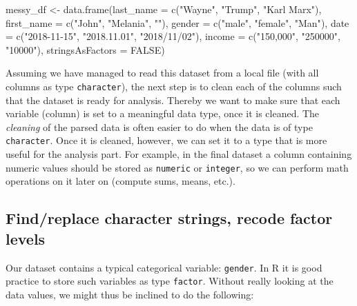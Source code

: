 \documentclass[
  12pt,
]{style/krantz}
\newenvironment{Shaded}{\begin{snugshade}}{\end{snugshade}}
\newcommand{\AttributeTok}[1]{\textcolor[rgb]{0.77,0.63,0.00}{#1}}
\newcommand{\ConstantTok}[1]{\textcolor[rgb]{0.00,0.00,0.00}{#1}}
\newcommand{\FunctionTok}[1]{\textcolor[rgb]{0.00,0.00,0.00}{#1}}
\newcommand{\NormalTok}[1]{#1}
\newcommand{\OtherTok}[1]{\textcolor[rgb]{0.56,0.35,0.01}{#1}}
\newcommand{\StringTok}[1]{\textcolor[rgb]{0.31,0.60,0.02}{#1}}
\begin{document}
\begin{Shaded}
\begin{Highlighting}[]
\NormalTok{messy\_df }\OtherTok{\textless{}{-}} \FunctionTok{data.frame}\NormalTok{(}\AttributeTok{last\_name =} \FunctionTok{c}\NormalTok{(}\StringTok{"Wayne"}\NormalTok{, }\StringTok{"Trump"}\NormalTok{, }\StringTok{"Karl Marx"}\NormalTok{),}
                       \AttributeTok{first\_name =} \FunctionTok{c}\NormalTok{(}\StringTok{"John"}\NormalTok{, }\StringTok{"Melania"}\NormalTok{, }\StringTok{""}\NormalTok{),}
                       \AttributeTok{gender =} \FunctionTok{c}\NormalTok{(}\StringTok{"male"}\NormalTok{, }\StringTok{"female"}\NormalTok{, }\StringTok{"Man"}\NormalTok{),}
                       \AttributeTok{date =} \FunctionTok{c}\NormalTok{(}\StringTok{"2018{-}11{-}15"}\NormalTok{, }\StringTok{"2018.11.01"}\NormalTok{, }\StringTok{"2018/11/02"}\NormalTok{),}
                       \AttributeTok{income =} \FunctionTok{c}\NormalTok{(}\StringTok{"150,000"}\NormalTok{, }\StringTok{"250000"}\NormalTok{, }\StringTok{"10000"}\NormalTok{),}
                       \AttributeTok{stringsAsFactors =} \ConstantTok{FALSE}\NormalTok{)}
\end{Highlighting}
\end{Shaded}

Assuming we have managed to read this dataset from a local file (with all columns as type \texttt{character}), the next step is to clean each of the columns such that the dataset is ready for analysis. Thereby we want to make sure that each variable (column) is set to a meaningful data type, once it is cleaned. The \emph{cleaning} of the parsed data is often easier to do when the data is of type \texttt{character}. Once it is cleaned, however, we can set it to a type that is more useful for the analysis part. For example, in the final dataset a column containing numeric values should be stored as \texttt{numeric} or \texttt{integer}, so we can perform math operations on it later on (compute sums, means, etc.).

\hypertarget{findreplace-character-strings-recode-factor-levels}{%
\subsection{Find/replace character strings, recode factor levels}\label{findreplace-character-strings-recode-factor-levels}}

Our dataset contains a typical categorical variable: \texttt{gender}. In R it is good practice to store such variables as type \texttt{factor}. Without really looking at the data values, we might thus be inclined to do the following:
\end{document}
